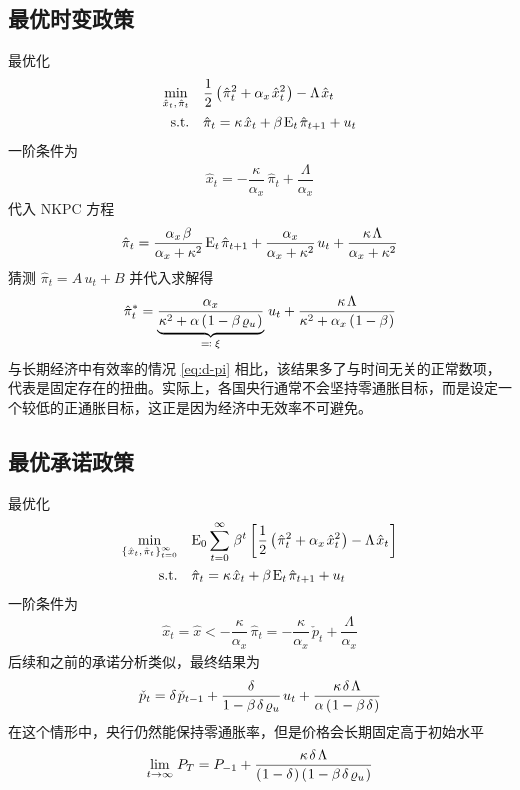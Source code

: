 \subsection{最优时变政策}

最优化
\begin{align*}
    \min_{\hat x_t,\,\hat\pi_t} \quad & \dfrac12\bka{\hat \pi_t^2 + \alpha_x\,\hat x_t^2} - \Lambda\,\hat x_t\\
    \n{s.t.} \quad & \hat \pi_t = \kappa\,\hat x_t + \beta\,\meant\,\hat\pi\nt + u_t
\end{align*}
一阶条件为
\begin{align*}
    \hat x_t=-\dfrac{\kappa}{\alpha_x}\,\hat \pi_t+\dfrac\Lambda{\alpha_x}
\end{align*}
代入 NKPC 方程
\begin{align*}
    \hat \pi_t = \dfrac{\alpha_x\,\beta}{\alpha_x+\kappa^2}\,\meant\,\hat\pi\nt + \dfrac{\alpha_x}{\alpha_x+\kappa^2}\,u_t + \dfrac{\kappa\,\Lambda}{\alpha_x+\kappa^2}
\end{align*}
猜测 \(\hat \pi_t=A\,u_t+B\) 并代入求解得
\begin{align*}
    \hat\pi_t^*=\underbrace{\dfrac{\alpha_x}{\kappa^2+\alpha\bka{1-\beta\,\varrho_u}}}_{\eqcolon\;\xi}\,u_t+\dfrac{\kappa\,\Lambda}{\kappa^2+\alpha_x\bka{1-\beta}}
\end{align*}
与长期经济中有效率的情况 \ref{eq:d-pi} 相比，该结果多了与时间无关的正常数项，代表是固定存在的扭曲。实际上，各国央行通常不会坚持零通胀目标，而是设定一个较低的正通胀目标，这正是因为经济中无效率不可避免。

\subsection{最优承诺政策}

最优化
\begin{align*}
    \min_{\bkd{\hat x_t,\,\hat\pi_t}^\infty_{t=0}}
    \quad &
    \meano\sum_{t=0}^\infty\, \beta^t\bks{\dfrac12\bka{\hat \pi_t^2+\alpha_x\,\hat x_t^2} - \Lambda\,\hat x_t}\\
    \n{s.t.}
    \quad &
    \hat \pi_t=\kappa\,\hat x_t+\beta\,\meant\,\hat\pi\nt+u_t
\end{align*}
一阶条件为
\begin{align}
    \hat x_t=\hat x\lt-\dfrac\kappa{\alpha_x}\,\hat\pi_t=-\dfrac\kappa{\alpha_x}\,\check p_t+\dfrac\Lambda{\alpha_x}\label{eq:x-commit-distort}
\end{align}
后续和之前的承诺分析类似，最终结果为
\begin{align}
    \check p_t = \delta\,\check p\lt + \dfrac\delta{1-\beta\,\delta\,\varrho_u}\, u_t + \dfrac{\kappa\,\delta\,\Lambda}{\alpha\bka{1-\beta\,\delta}}\label{eq:p-commit-distort}
\end{align}
在这个情形中，央行仍然能保持零通胀率，但是价格会长期固定高于初始水平
\begin{align*}
    \lim_{t\to\infty}\,P_T=P_{-1}+\dfrac{\kappa\,\delta\,\Lambda}{\bka{1-\delta}\bka{1-\beta\,\delta\,\varrho_u}}
\end{align*}

